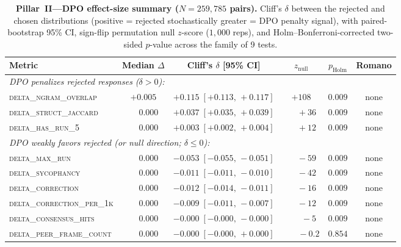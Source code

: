 \documentclass[11pt]{article}
\begin{document}
\begin{table}[t]
\centering
\small
\caption{\textbf{Pillar~II---DPO effect-size summary ($N{=}259{,}785$ pairs).} Cliff's $\delta$ between the rejected and chosen distributions (positive = rejected stochastically greater = DPO penalty signal), with paired-bootstrap 95\% CI, sign-flip permutation null $z$-score ($1{,}000$ reps), and Holm--Bonferroni-corrected two-sided $p$-value across the family of 9 tests.}
\label{tab:data_audit}
\setlength{\tabcolsep}{4pt}
\begin{tabular}{lccccc}
\toprule
\textbf{Metric} & \textbf{Median $\Delta$} & \textbf{Cliff's $\delta$ [95\% CI]} & \textbf{$z_{\text{null}}$} & \textbf{$p_{\text{Holm}}$} & \textbf{Romano} \\
\midrule
\multicolumn{6}{l}{\emph{DPO penalizes rejected responses ($\delta>0$):}}\\
\textsc{delta\_ngram\_overlap}     & $+0.005$ & $+0.115\;[+0.113,\,+0.117]$ & $+108$ & $0.009$ & none \\
\textsc{delta\_struct\_jaccard}    & $\phantom{+}0.000$ & $+0.037\;[+0.035,\,+0.039]$ & $\phantom{+0}+36$ & $0.009$ & none \\
\textsc{delta\_has\_run\_5}        & $\phantom{+}0.000$ & $+0.003\;[+0.002,\,+0.004]$ & $\phantom{+0}+12$ & $0.009$ & none \\
\midrule
\multicolumn{6}{l}{\emph{DPO weakly favors rejected (or null direction; $\delta\leq 0$):}}\\
\textsc{delta\_max\_run}           & $\phantom{+}0.000$ & $-0.053\;[-0.055,\,-0.051]$ & $\phantom{+0}-59$ & $0.009$ & none \\
\textsc{delta\_sycophancy}         & $\phantom{+}0.000$ & $-0.011\;[-0.011,\,-0.010]$ & $\phantom{+0}-42$ & $0.009$ & none \\
\textsc{delta\_correction}         & $\phantom{+}0.000$ & $-0.012\;[-0.014,\,-0.011]$ & $\phantom{+0}-16$ & $0.009$ & none \\
\textsc{delta\_correction\_per\_1k}& $\phantom{+}0.000$ & $-0.009\;[-0.011,\,-0.007]$ & $\phantom{+0}-12$ & $0.009$ & none \\
\textsc{delta\_consensus\_hits}    & $\phantom{+}0.000$ & $-0.000\;[-0.000,\,-0.000]$ & $\phantom{+00}-5$ & $0.009$ & none \\
\textsc{delta\_peer\_frame\_count} & $\phantom{+}0.000$ & $-0.000\;[-0.000,\,+0.000]$ & $\phantom{+00}-0.2$ & $\mathbf{0.854}$ & none \\
\bottomrule
\end{tabular}
\end{table}
\end{document}

